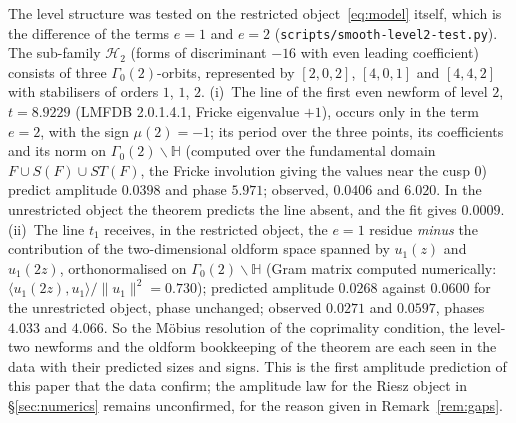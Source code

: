 \documentclass[11pt,a4paper]{article}
\theoremstyle{remark}\newtheorem{remark}[theorem]{Remark}
\begin{document}
The level structure was tested on the restricted object~\eqref{eq:model} itself, which is the difference of the terms
$e=1$ and $e=2$ (\texttt{scripts/smooth-level2-test.py}). The sub-family $\mathcal H_2$ (forms of discriminant $-16$
with even leading coefficient) consists of three $\Gamma_0(2)$-orbits, represented by $[2,0,2]$, $[4,0,1]$ and $[4,4,2]$ with
stabilisers of orders $1$, $1$, $2$. (i)~The line of the first even newform of level $2$, $t=8.9229$ (LMFDB 2.0.1.4.1,
Fricke eigenvalue $+1$), occurs only in the term $e=2$, with the sign $\mu(2)=-1$; its period over the three points, its
coefficients and its norm on $\Gamma_0(2)\backslash\mathbb H$ (computed over the fundamental domain
$F\cup S(F)\cup ST(F)$, the Fricke involution giving the values near the cusp $0$) predict amplitude $0.0398$ and
phase $5.971$; observed, $0.0406$ and $6.020$. In the unrestricted object the theorem predicts the line absent, and the
fit gives $0.0009$. (ii)~The line $t_1$ receives, in the restricted object, the $e=1$ residue \emph{minus} the
contribution of the two-dimensional oldform space spanned by $u_1(z)$ and $u_1(2z)$, orthonormalised on
$\Gamma_0(2)\backslash\mathbb H$ (Gram matrix computed numerically: $\langle u_1(2z),u_1\rangle/\|u_1\|^2=0.730$); predicted
amplitude $0.0268$ against $0.0600$ for the unrestricted object, phase unchanged; observed $0.0271$ and $0.0597$, phases
$4.033$ and $4.066$. So the M\"obius resolution of the coprimality condition, the level-two newforms and the oldform
bookkeeping of the theorem are each seen in the data with their predicted sizes and signs. This is the first amplitude
prediction of this paper that the data confirm; the amplitude law for the Riesz object in \S\ref{sec:numerics} remains
unconfirmed, for the reason given in Remark~\ref{rem:gaps}.
\end{document}
